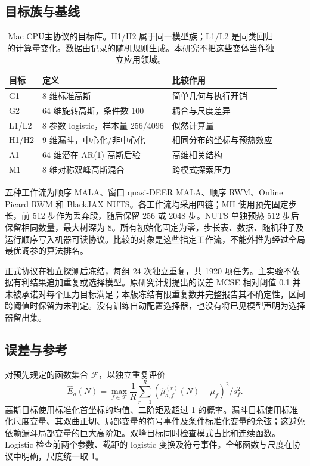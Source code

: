 \documentclass[UTF8,fontset=fandol,zihao=-4]{ctexart}
\begin{document}
\subsection{目标族与基线}
\begin{table}[htbp]\centering\small
\begin{tabular}{lll}\toprule
目标 & 定义 & 比较作用\\\midrule
G1 & 8 维标准高斯 & 简单几何与执行开销\\
G2 & 64 维旋转高斯，条件数 100 & 耦合与尺度差异\\
L1/L2 & 8 参数 logistic，样本量 256/4096 & 似然计算量\\
H1/H2 & 9 维漏斗，中心化/非中心化 & 相同分布的坐标与预热效应\\
A1 & 64 维潜在 AR(1) 高斯后验 & 高维相关结构\\
M1 & 8 维对称双峰高斯混合 & 跨模式探索压力\\\bottomrule
\end{tabular}
\caption{Mac CPU主协议的目标库。H1/H2 属于同一模型族；L1/L2 是同类回归的计算量变化。数据由记录的随机规则生成。本研究不把这些变体当作独立应用领域。}
\end{table}

五种工作流为顺序 MALA、窗口 quasi-DEER MALA、顺序 RWM、Online Picard RWM 和 BlackJAX NUTS。各工作流均采用四链；MH 使用预先固定步长，前 512 步作为丢弃段，随后保留 256 或 2048 步。NUTS 单独预热 512 步后保留相同数量，最大树深为 8。所有初始化固定为零，步长表、数据、随机种子及运行顺序写入机器可读协议。比较的对象是这些指定工作流，不能外推为经过全局最优调参的算法排名。

正式协议在独立探测后冻结，每组 24 次独立重复，共 1920 项任务。主实验不依据有利结果追加重复或选择模型。原研究计划提出的误差 MCSE 相对阈值 0.1 并未被承诺对每个压力目标满足；本版冻结有限重复数并完整报告其不确定性，区间跨阈值时保留为未判定。没有训练自动配置选择器，也没有将已见模型声明为选择器留出集。

\subsection{误差与参考}
对预先规定的函数集合 $\mathcal F$，以独立重复评价
\begin{equation}
 \widehat E_a(N)=\max_{f\in\mathcal F}\frac1R\sum_{r=1}^R
 \left(\widehat\mu_{a,f}^{(r)}(N)-\mu_f\right)^2/s_f^2.
\end{equation}
高斯目标使用标准化首坐标的均值、二阶矩及超过 1 的概率。漏斗目标使用标准化尺度变量、其双曲正切、局部变量的符号事件及条件标准化变量的余弦；这避免依赖漏斗局部变量的巨大高阶矩。双峰目标同时检查模式占比和连续函数。Logistic 检查前两个参数、截距的 logistic 变换及符号事件。全部函数与尺度在协议中明确，尺度统一取 1。
\end{document}
